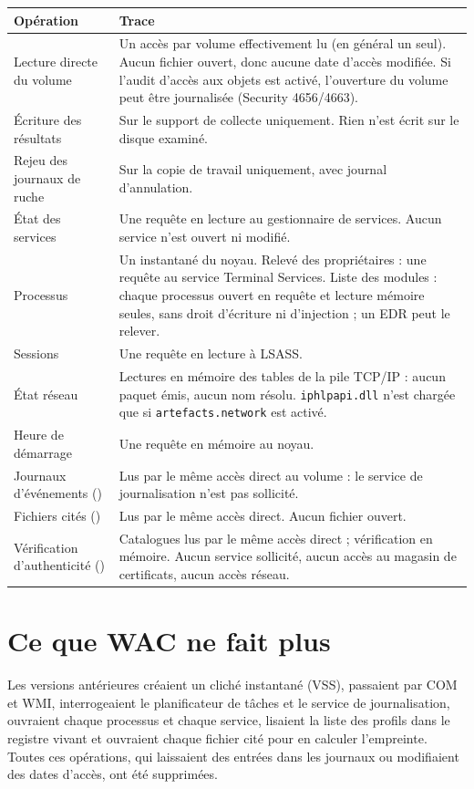 \documentclass[11pt,a4paper,oneside]{report}
\begin{document}
\begin{longtable}{@{}L{4.3cm}L{10.1cm}@{}}
\toprule
\bfseries Opération & \bfseries Trace \\
\midrule
\endhead
Lecture directe du volume & Un accès par volume effectivement lu (en général un
  seul). Aucun fichier ouvert, donc aucune date d'accès modifiée. Si l'audit
  d'accès aux objets est activé, l'ouverture du volume peut être journalisée
  (Security 4656/4663). \\
Écriture des résultats & Sur le support de collecte uniquement. Rien n'est écrit
  sur le disque examiné. \\
Rejeu des journaux de ruche & Sur la copie de travail uniquement, avec journal
  d'annulation. \\
État des services & Une requête en lecture au gestionnaire de services. Aucun
  service n'est ouvert ni modifié. \\
Processus & Un instantané du noyau. Relevé des propriétaires : une requête au
  service Terminal Services. Liste des modules : chaque processus ouvert en
  requête et lecture mémoire seules, sans droit d'écriture ni d'injection ; un
  EDR peut le relever. \\
Sessions & Une requête en lecture à LSASS. \\
État réseau & Lectures en mémoire des tables de la pile TCP/IP : aucun paquet
  émis, aucun nom résolu. \texttt{iphlpapi.dll} n'est chargée que si
  \texttt{artefacts.network} est activé. \\
Heure de démarrage & Une requête en mémoire au noyau. \\
Journaux d'événements () & Lus par le même accès direct au volume :
  le service de journalisation n'est pas sollicité. \\
Fichiers cités () & Lus par le même accès direct. Aucun fichier
  ouvert. \\
Vérification d'authenticité () & Catalogues lus par le même accès
  direct ; vérification en mémoire. Aucun service sollicité, aucun accès au
  magasin de certificats, aucun accès réseau. \\
\bottomrule
\end{longtable}

\section{Ce que WAC ne fait plus}

Les versions antérieures créaient un cliché instantané (VSS), passaient par COM et
WMI, interrogeaient le planificateur de tâches et le service de journalisation,
ouvraient chaque processus et chaque service, lisaient la liste des profils dans
le registre vivant et ouvraient chaque fichier cité pour en calculer
l'empreinte. Toutes ces opérations, qui laissaient des entrées dans les journaux
ou modifiaient des dates d'accès, ont été supprimées.
\end{document}
